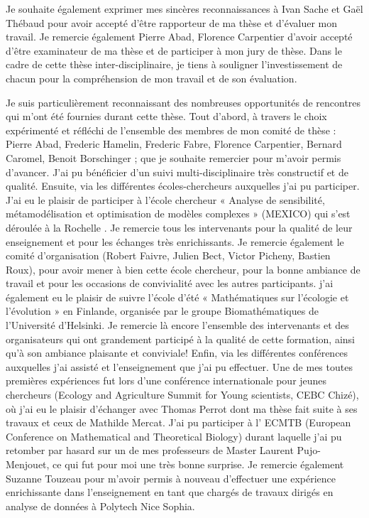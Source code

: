 Je souhaite également exprimer  mes sincères reconnaissances  à  Ivan Sache et Gaël Thébaud pour avoir accepté d'être rapporteur de ma thèse et d’évaluer mon travail. Je remercie également Pierre Abad, Florence Carpentier d’avoir accepté d'être examinateur de ma thèse et de participer à mon jury de thèse. Dans le cadre de cette thèse inter-disciplinaire, je tiens à souligner l’investissement de chacun pour la compréhension de mon travail et de son évaluation.

Je suis particulièrement reconnaissant des nombreuses opportunités de rencontres qui m’ont
été fournies durant cette thèse. Tout d’abord, à travers le choix  expérimenté et réfléchi de l’ensemble
des membres de mon comité de thèse : 
 Pierre Abad,
 Frederic Hamelin,
 Frederic Fabre,
 Florence Carpentier,
 Bernard Caromel,
 Benoit Borschinger ;
que je souhaite remercier pour m’avoir permis d'avancer. J’ai pu bénéficier d’un suivi multi-disciplinaire très constructif et de qualité.
Ensuite, via les différentes écoles-chercheurs  auxquelles j’ai pu participer. 
J’ai eu  le plaisir de participer à l’école chercheur « Analyse de sensibilité, métamodélisation et
optimisation de modèles complexes » (MEXICO) qui s’est déroulée à la Rochelle%
. Je remercie tous les intervenants pour la qualité de leur enseignement et pour les échanges très enrichissants. Je remercie également le comité d'organisation (Robert Faivre, Julien Bect, Victor Picheny, Bastien Roux), pour avoir mener à bien cette école chercheur, pour la bonne ambiance de travail et pour les occasions de convivialité  avec les autres participants. 
 j’ai également eu le plaisir de suivre  l'école d'été « Mathématiques sur l'écologie et l'évolution » en Finlande,
organisée par le groupe Biomathématiques de l'Université d'Helsinki. %
 Je remercie là encore l’ensemble des intervenants et des organisateurs qui ont grandement participé
à la qualité de cette formation, ainsi qu’à son ambiance 
plaisante  et conviviale! %
Enfin, via les différentes conférences  auxquelles j’ai assisté et l'enseignement que j'ai pu effectuer. Une de mes toutes premières expériences fut lors  d'une conférence internationale pour jeunes chercheurs (Ecology and Agriculture
Summit for Young scientists, CEBC Chizé), où j’ai eu le plaisir
d’échanger avec Thomas Perrot dont ma thèse fait suite à ses travaux et ceux de Mathilde Mercat. J'ai pu participer à l' ECMTB (European Conference on Mathematical and Theoretical Biology) durant laquelle j’ai pu retomber par hasard sur un de mes professeurs de Master Laurent Pujo-Menjouet,  ce qui fut pour moi une très bonne surprise. Je remercie également Suzanne Touzeau pour m'avoir permis à nouveau d'effectuer une expérience enrichissante dans l'enseignement en tant que chargés de travaux dirigés en analyse de données à Polytech Nice Sophia.%
